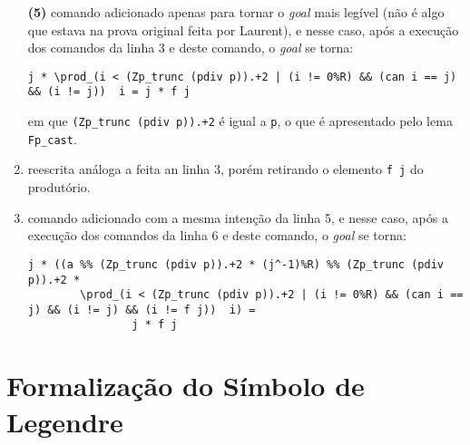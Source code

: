 \begin{enumerate}[label=\textbf{\roman*.}]
\begin{enumerate}
                \item[\textbf{(5)}] comando adicionado apenas para tornar o \textit{goal} mais legível (não é algo que estava na prova original feita por Laurent), e nesse caso, após a execução dos comandos da linha 3 e deste comando, o \textit{goal} se torna:
                        \begin{lstlisting}[language=coq,frame=single,tabsize=1]
j * \prod_(i < (Zp_trunc (pdiv p)).+2 | (i != 0%R) && (can i == j) && (i != j))  i = j * f j
                        \end{lstlisting}
                em que \lstinline[language=coq]|(Zp_trunc (pdiv p)).+2| é igual a \lstinline[language=coq]|p|, o que é apresentado pelo lema \lstinline[language=coq]|Fp_cast|.

                \item[\textbf{(6)}] reescrita análoga a feita an linha 3, porém retirando o elemento \lstinline[language=coq]|f j| do produtório.
                
                \item[\textbf{(8)}] comando adicionado com a mesma intenção da linha 5, e nesse caso, após a execução dos comandos da linha 6 e deste comando, o \textit{goal} se torna:
                        \begin{lstlisting}[language=coq,frame=single,tabsize=1]
j * ((a %% (Zp_trunc (pdiv p)).+2 * (j^-1)%R) %% (Zp_trunc (pdiv p)).+2 *
        \prod_(i < (Zp_trunc (pdiv p)).+2 | (i != 0%R) && (can i == j) && (i != j) && (i != f j))  i) = 
                j * f j
                        \end{lstlisting}        


                


        \end{enumerate}

\end{enumerate}


\section{Formalização do Símbolo de Legendre}

